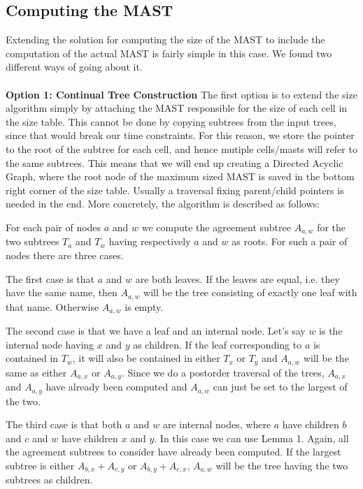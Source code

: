 \subsection{Computing the MAST}
Extending the solution for computing the size of the MAST to include the computation of the actual MAST is fairly simple in this case. We found two different ways of going about it. 
\\
\\
\textbf{Option 1: Continual Tree Construction}
The first option is to extend the size algorithm simply by attaching the MAST responsible for the size of each cell in the size table. This cannot be done by copying subtrees from the input trees, since that would break our time constraints. For this reason, we store the pointer to the root of the subtree for each cell, and hence mutiple cells/masts will refer to the same subtrees. This means that we will end up creating a Directed Acyclic Graph, where the root node of the maximum sized MAST is saved in the bottom right corner of the size table. Usually a traversal fixing parent/child pointers is needed in the end.
More concretely, the algorithm is described as follows: 

For each pair of nodes $a$ and $w$ we compute the agreement subtree $A_{a,w}$ for the two subtrees $T_a$ and $T_w$ having respectively $a$ and $w$ as roots. For such a pair of nodes there are three cases.

The first case is that $a$ and $w$ are both leaves. If the leaves are equal, i.e. they have the same name, then $A_{a,w}$ will be the tree consisting of exactly one leaf with that name. Otherwise $A_{a,w}$ is empty.

The second case is that we have a leaf and an internal node. Let's say $w$ is the internal node having $x$ and $y$ as children. If the leaf corresponding to $a$ is contained in $T_w$, it will also be contained in either $T_x$ or $T_y$ and $A_{a,w}$ will be the same as either $A_{a,x}$ or $A_{a,y}$. Since we do a postorder traversal of the trees, $A_{a,x}$ and $A_{a,y}$ have already been computed and $A_{a,w}$ can just be set to the largest of the two.

The third case is that both $a$ and $w$ are internal nodes, where $a$ have children $b$ and $c$ and $w$ have children $x$ and $y$. In this case we can use Lemma 1. Again, all the agreement subtrees to consider have already been computed. If the largest subtree is either $A_{b,x} + A_{c,y}$ or $A_{b,y} + A_{c,x}$, $A_{a,w}$ will be the tree having the two subtrees as children.


